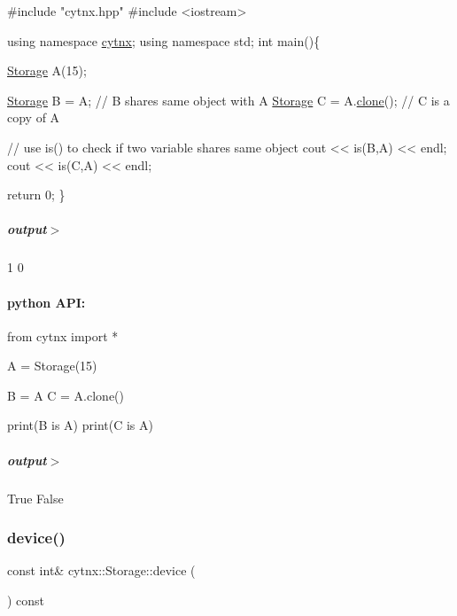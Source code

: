 \begin{DoxyCodeInclude}
\textcolor{preprocessor}{#include "cytnx.hpp"}
\textcolor{preprocessor}{#include <iostream>}


\textcolor{keyword}{using namespace }\hyperlink{namespacecytnx}{cytnx};
\textcolor{keyword}{using namespace }std;
\textcolor{keywordtype}{int} main()\{ 

    \hyperlink{classcytnx_1_1Storage}{Storage} A(15);

    \hyperlink{classcytnx_1_1Storage}{Storage} B = A; \textcolor{comment}{// B shares same object with A}
    \hyperlink{classcytnx_1_1Storage}{Storage} C = A.\hyperlink{classcytnx_1_1Tensor_a5e2248e9babdb786167ed349df9084ae}{clone}(); \textcolor{comment}{// C is a copy of A}
    
    \textcolor{comment}{// use is() to check if two variable shares same object}
    cout << is(B,A) << endl;
    cout << is(C,A) << endl;

    \textcolor{keywordflow}{return} 0;
\}

\end{DoxyCodeInclude}
 \subparagraph*{output$>$}


\begin{DoxyVerbInclude}
1
0
\end{DoxyVerbInclude}
 \paragraph*{python A\+PI\+:}


\begin{DoxyCodeInclude}
\textcolor{keyword}{from} cytnx \textcolor{keyword}{import} *

A = Storage(15)

B = A
C = A.clone()

print(B \textcolor{keywordflow}{is} A)
print(C \textcolor{keywordflow}{is} A)

\end{DoxyCodeInclude}
 \subparagraph*{output$>$}


\begin{DoxyVerbInclude}
True
False
\end{DoxyVerbInclude}
 \mbox{\label{classcytnx_1_1Storage_a4c3e27582d7f951e6b76ccbb92f7c537}} 
\subsubsection{\texorpdfstring{device()}{device()}}
{\footnotesize\ttfamily const int\& cytnx\+::\+Storage\+::device (\begin{DoxyParamCaption}{ }\end{DoxyParamCaption}) const\hspace{0.3cm}{\ttfamily [inline]}}



